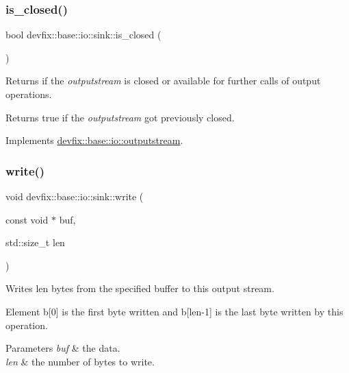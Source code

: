 \subsubsection{\texorpdfstring{is\+\_\+closed()}{is\_closed()}}
{\footnotesize\ttfamily bool devfix\+::base\+::io\+::sink\+::is\+\_\+closed (\begin{DoxyParamCaption}{ }\end{DoxyParamCaption})\hspace{0.3cm}{\ttfamily [virtual]}}



Returns if the {\itshape outputstream} is closed or available for further calls of output operations. 

\begin{DoxyReturn}{Returns}
true if the {\itshape outputstream} got previously closed. 
\end{DoxyReturn}


Implements \hyperlink{structdevfix_1_1base_1_1io_1_1outputstream_a52bd2eac8f6fbc496eab5138a48d2f06}{devfix\+::base\+::io\+::outputstream}.

\mbox{\label{structdevfix_1_1base_1_1io_1_1sink_a6eade9933d316139e952b7a442f3c56d}} 
\subsubsection{\texorpdfstring{write()}{write()}}
{\footnotesize\ttfamily void devfix\+::base\+::io\+::sink\+::write (\begin{DoxyParamCaption}\item[{const void $\ast$}]{buf,  }\item[{std\+::size\+\_\+t}]{len }\end{DoxyParamCaption})\hspace{0.3cm}{\ttfamily [virtual]}}



Writes len bytes from the specified buffer to this output stream. 

Element b\mbox{[}0\mbox{]} is the first byte written and b\mbox{[}len-\/1\mbox{]} is the last byte written by this operation.


\begin{DoxyParams}{Parameters}
{\em buf} & the data. \\
\hline
{\em len} & the number of bytes to write. \\
\hline
\end{DoxyParams}


